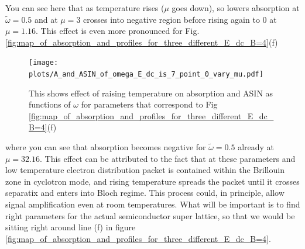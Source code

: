 \documentclass[40pt,letterpaper,physrev]{article}
\begin{document}
	You can see here that as temperature rises ($\mu$ goes down), so lowers absorption at $\tilde{\omega} = 0.5$ and
	at $\mu = 3$ crosses into negative region before rising again to 0 at $\mu = 1.16$. This effect is even more
	pronounced for Fig. \ref{fig:map_of_absorption_and_profiles_for_three_different_E_dc_B=4}(f)
	\begin{figure}[H]
	  \centering
	  \normalsize %
	  \texttt{[image: plots/A\_and\_ASIN\_of\_omega\_E\_dc\_is\_7\_point\_0\_vary\_mu.pdf]}
	  \caption{This shows effect of raising temperature on absorption and ASIN as functions of $\omega$ for 
	  parameters that correspond to Fig \ref{fig:map_of_absorption_and_profiles_for_three_different_E_dc_B=4}(f)}
	  \label{fig:E_dc=7.0_B=4_different_mu}	  
	\end{figure}
    where you can see that absorption becomes negative for $\tilde{\omega} = 0.5$ already at $\mu = 32.16$. This effect
    can be attributed to the fact that at these parameters and low temperature electron distribution packet is contained
    within the Brillouin zone in cyclotron mode, and rising temperature spreads the packet until it crosses separatix and
    enters into Bloch regime. This process could, in principle, allow signal amplification even at room temperatures.
    What will be important is to find right parameters for the actual semiconductor super lattice, so that we would be
    sitting right around line (f) in figure \ref{fig:map_of_absorption_and_profiles_for_three_different_E_dc_B=4}.
\end{document}
